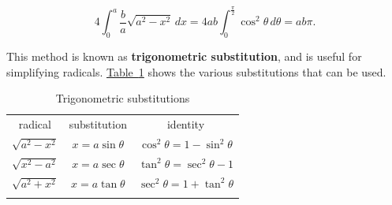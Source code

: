 \documentclass[10pt,]{book}
\newcommand{\terminology}[1]{\textbf{#1}}
\theoremstyle{ptxplainnotitle}
\theoremstyle{ptxplaintitle}
\theoremstyle{ptxplainnotitle}
\theoremstyle{ptxplaintitle}
\theoremstyle{ptxplainnotitle}
\theoremstyle{ptxplaintitle}
\theoremstyle{ptxdefinitionnotitle}
\theoremstyle{ptxdefinitiontitle}
\theoremstyle{ptxdefinitionnotitle}
\theoremstyle{ptxdefinitiontitle}
\theoremstyle{ptxdefinitionnotitle}
\theoremstyle{ptxdefinitiontitle}
\theoremstyle{ptxdefinitionnotitle}
\theoremstyle{ptxdefinitiontitle}
\theoremstyle{ptxdefinitionnotitle}
\theoremstyle{ptxdefinitiontitle}
\numberwithin{equation}{section}
\newcommand{\hrulethin}  {\noalign{\hrule height 0.04em}}
\newcommand{\hrulethick} {\noalign{\hrule height 0.11em}}
\begin{document}
\begin{equation*}
4\int_{0}^{a}\frac{b}{a}\sqrt{a^{2} - x^{2}}\,dx = 4ab\int_{0}^{\frac{\pi}{2}}\cos^{2}\theta\,d\theta = ab\pi.
\end{equation*}
%
\par
\hypertarget{p-544}{}%
This method is known as \terminology{trigonometric substitution}, and is useful for simplifying radicals. \hyperref[table-trig-substitutions]{Table~\ref{table-trig-substitutions}} shows the various substitutions that can be used.%
\begin{table}
\centering
\begin{tabular}{ccc}\hrulethick
radical&substitution&identity\tabularnewline\hrulethin
\(\sqrt{a^{2} - x^{2}}\)&\(x = a\sin\theta\)&\(\cos^{2}\theta = 1-\sin^{2}\theta\)\tabularnewline[0pt]
\(\sqrt{x^{2} - a^{2}}\)&\(x = a\sec\theta\)&\(\tan^{2}\theta = \sec^{2}\theta - 1\)\tabularnewline[0pt]
\(\sqrt{a^{2} + x^{2}}\)&\(x = a\tan\theta\)&\(\sec^{2}\theta = 1+\tan^{2}\theta\)\tabularnewline\hrulethick
\end{tabular}
\caption{Trigonometric substitutions\label{table-trig-substitutions}}
\end{table}
\end{document}
